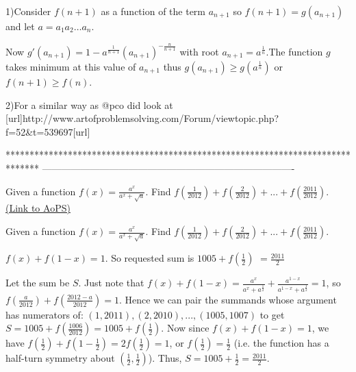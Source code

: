 \begin{solution}
	1)Consider $f(n+1)$ as a function of the term $a_{n+1}$ so $f(n+1)=g(a_{n+1})$ and let $a=a_1a_2 \dots a_n$.

Now $g'(a_{n+1})=1-a^{\frac{1}{n+1}}\left(a_{n+1}\right)^{-\frac{n}{n+1}}$ with root $a_{n+1}=a^{\frac{1}{n}}$.The function $g$ takes minimum at this value of $a_{n+1}$ thus $g(a_{n+1})\geq g(a^{\frac{1}{n}})$ or $f(n+1) \geq f(n)$.

2)For a similar way as @pco did look at [url]http://www.artofproblemsolving.com/Forum/viewtopic.php?f=52&t=539697[\/url]
\end{solution}
*******************************************************************************
-------------------------------------------------------------------------------

\begin{problem}
	Given a function  $f(x)=\frac{a^x}{a^x+\sqrt{a}}$. Find $f(\frac{1}{2012})+f(\frac{2}{2012})+...+f(\frac{2011}{2012})$.
	\flushright \href{https://artofproblemsolving.com/community/c6h572064}{(Link to AoPS)}
\end{problem}



\begin{solution}
	\begin{tcolorbox}Given a function  $f(x)=\frac{a^x}{a^x+\sqrt{a}}$. Find $f(\frac{1}{2012})+f(\frac{2}{2012})+...+f(\frac{2011}{2012})$.\end{tcolorbox}
$f(x)+f(1-x)=1$. So requested sum is $1005+f(\frac 12)$ $=\boxed{\frac{2011}2}$
\end{solution}



\begin{solution}
	Let the sum be $S$. Just note that $f(x)+f(1-x)=\frac{a^x}{a^x+a^{\frac{1}{2}}}+\frac{a^{1-x}}{a^{1-x}+a^{\frac{1}{2}}}=1$, so $f(\frac{a}{2012})+f(\frac{2012-a}{2012})=1$. Hence we can pair the summands whose argument has numerators of: $(1,2011), (2,2010), ..., (1005, 1007)$ to get $S=1005+f(\frac{1006}{2012})=1005+f(\frac{1}{2})$. Now since $f(x)+f(1-x)=1$, we have $f(\frac{1}{2})+f(1-\frac{1}{2})=2f(\frac{1}{2})=1$, or $f(\frac{1}{2})=\frac{1}{2}$ (i.e. the function has a half-turn symmetry about $(\frac{1}{2}, \frac{1}{2})$). Thus, $S=1005+\frac{1}{2}=\boxed{\frac{2011}{2}}$.
\end{solution}



